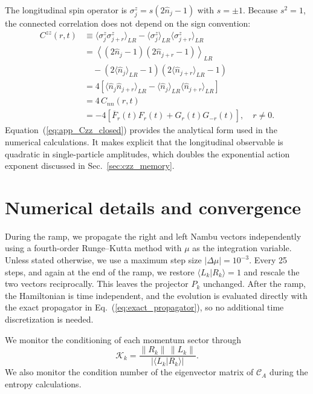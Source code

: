 \documentclass[aps,prb,reprint,superscriptaddress,amsmath,amssymb,floatfix]{revtex4-2}
\begin{document}
   The longitudinal spin operator is $\sigma_j^z=s(2\hat n_j-1)$ with $s=\pm1$. Because $s^2=1$, the connected correlation does not depend on the sign convention:
\begin{equation}
\begin{aligned}
C^{zz}(r,t) &\equiv \langle \sigma_j^z\sigma_{j+r}^z\rangle_{LR} - \langle \sigma_j^z\rangle_{LR} \langle \sigma_{j+r}^z\rangle_{LR} \\ &= \left\langle (2\hat n_j-1)(2\hat n_{j+r}-1) \right\rangle_{LR} \\ &\quad - \left( 2\langle\hat n_j\rangle_{LR}-1 \right) \left( 2\langle\hat n_{j+r}\rangle_{LR}-1 \right) \\ &= 4\left[ \langle\hat n_j\hat n_{j+r}\rangle_{LR} - \langle\hat n_j\rangle_{LR} \langle\hat n_{j+r}\rangle_{LR} \right] \\ &= 4\,C_{nn}(r,t) \\ &= -4 \left[ \overline F_r(t)F_r(t) + G_r(t)G_{-r}(t) \right], \quad r\neq0 .
\end{aligned} \label{eq:app_Czz_closed}
\end{equation}
Equation~(\ref{eq:app_Czz_closed}) provides the analytical form used in the numerical calculations. It makes explicit that the longitudinal observable is quadratic in single-particle amplitudes, which doubles the exponential action exponent discussed in Sec.~\ref{sec:czz_memory}.


\section{Numerical details and convergence}
\label{app:numerics}


During the ramp, we propagate the right and left Nambu vectors independently
using a fourth-order Runge--Kutta method with $\mu$ as the integration
variable. Unless stated otherwise, we use a maximum step size
$|\Delta\mu|=10^{-3}$. Every 25 steps, and again at the end of the ramp,
we restore $\langle L_k|R_k\rangle=1$ and rescale the two vectors
reciprocally. This leaves the projector $P_k$ unchanged. After the ramp,
the Hamiltonian is time independent, and the evolution is evaluated
directly with the exact propagator in Eq.~(\ref{eq:exact_propagator}),
so no additional time discretization is needed.

We monitor the conditioning of each momentum sector through
\begin{equation}
\mathcal K_k=
\frac{\|R_k\|\,\|L_k\|}
{|\langle L_k|R_k\rangle|}.
\label{eq:condition_measure}
\end{equation}
We also monitor the condition number of the eigenvector matrix of
$\mathcal C_A$ during the entropy calculations.
\end{document}
